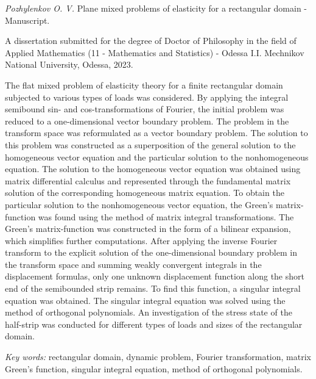 \textit{Pozhylenkov O. V.}
Plane mixed problems of elasticity for a rectangular domain - Manuscript.

A dissertation submitted for the degree of Doctor of Philosophy in the field of Applied Mathematics (11 - Mathematics and Statistics) - Odessa I.I. Mechnikov National University, Odessa, 2023.

The flat mixed problem of elasticity theory for a finite rectangular domain subjected to various types of loads was considered.
By applying the integral semibound sin- and cos-transformations of Fourier, the initial problem was reduced to a one-dimensional vector boundary problem.
The problem in the transform space was reformulated as a vector boundary problem.
The solution to this problem was constructed as a superposition of the general solution to the homogeneous vector equation and the particular solution to the nonhomogeneous equation.
The solution to the homogeneous vector equation was obtained using matrix differential calculus and represented through the fundamental matrix solution of the corresponding homogeneous matrix equation.
To obtain the particular solution to the nonhomogeneous vector equation, the Green's matrix-function was found using the method of matrix integral transformations. The Green's matrix-function was constructed in the form of a bilinear expansion, which simplifies further computations.
After applying the inverse Fourier transform to the explicit solution of the one-dimensional boundary problem in the transform space and summing weakly convergent integrals in the displacement formulas, only one unknown displacement function along the short end of the semibounded strip remains.
To find this function, a singular integral equation was obtained.
The singular integral equation was solved using the method of orthogonal polynomials.
An investigation of the stress state of the half-strip was conducted for different types of loads and sizes of the rectangular domain.


\textit{Key words:}
rectangular domain, dynamic problem, Fourier transformation, matrix Green's function, singular integral equation, method of orthogonal polynomials.